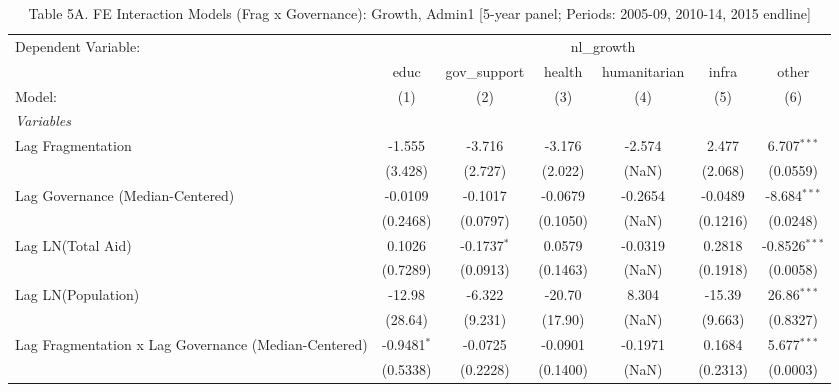 
\begin{table}[H]
   \caption{Table 5A. FE Interaction Models (Frag x Governance): Growth, Admin1 [5-year panel; Periods: 2005-09, 2010-14, 2015 endline]}
   \centering
   \begin{tabular}{lcccccc}
      \tabularnewline \midrule \midrule
      Dependent Variable: & \multicolumn{6}{c}{nl\_growth}\\
                                                           & educ          & gov\_support  & health   & humanitarian & infra    & other \\   
      Model:                                               & (1)           & (2)           & (3)      & (4)          & (5)      & (6)\\  
      \midrule
      \emph{Variables}\\
      Lag Fragmentation                                    & -1.555        & -3.716        & -3.176   & -2.574       & 2.477    & 6.707$^{***}$\\   
                                                           & (3.428)       & (2.727)       & (2.022)  & (NaN)        & (2.068)  & (0.0559)\\   
      Lag Governance (Median-Centered)                     & -0.0109       & -0.1017       & -0.0679  & -0.2654      & -0.0489  & -8.684$^{***}$\\   
                                                           & (0.2468)      & (0.0797)      & (0.1050) & (NaN)        & (0.1216) & (0.0248)\\   
      Lag LN(Total Aid)                                    & 0.1026        & -0.1737$^{*}$ & 0.0579   & -0.0319      & 0.2818   & -0.8526$^{***}$\\   
                                                           & (0.7289)      & (0.0913)      & (0.1463) & (NaN)        & (0.1918) & (0.0058)\\   
      Lag LN(Population)                                   & -12.98        & -6.322        & -20.70   & 8.304        & -15.39   & 26.86$^{***}$\\   
                                                           & (28.64)       & (9.231)       & (17.90)  & (NaN)        & (9.663)  & (0.8327)\\   
      Lag Fragmentation x Lag Governance (Median-Centered) & -0.9481$^{*}$ & -0.0725       & -0.0901  & -0.1971      & 0.1684   & 5.677$^{***}$\\   
                                                           & (0.5338)      & (0.2228)      & (0.1400) & (NaN)        & (0.2313) & (0.0003)\\   

\end{tabular}
\end{table}
